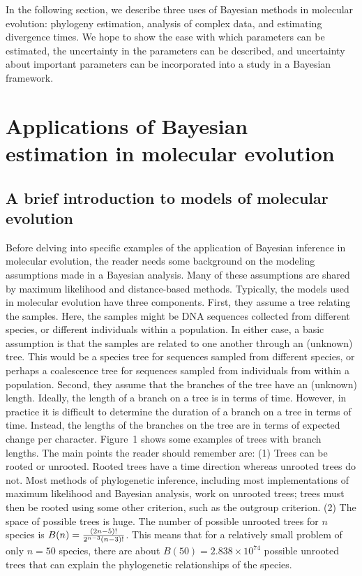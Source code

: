 \documentclass{svmult}
\begin{document}
In the following section, we describe three uses of Bayesian methods in molecular evolution:
phylogeny estimation, analysis of complex data, and estimating divergence times.
We hope to show the ease with which parameters can be estimated, the uncertainty in
the parameters can be described, and uncertainty about important parameters can be incorporated
into a study in a Bayesian framework.

\section{Applications of Bayesian estimation in molecular evolution}
\label{sec:3}

\subsection{A brief introduction to models of molecular evolution}


Before delving into specific examples of the application of Bayesian inference in molecular evolution, the reader
needs some background on the modeling assumptions made in a Bayesian analysis. Many of these assumptions
are shared by maximum likelihood and distance-based methods.
Typically, the models used in molecular evolution have three components. First, they assume
a tree relating the samples. Here, the samples might be DNA sequences collected from different
species, or different individuals within a population. In either case, a basic assumption
is that the samples are related to one another through an (unknown) tree. This would be
a species tree for sequences sampled from different species, or perhaps a coalescence tree for sequences
sampled from individuals from within a population. Second, they assume that the branches
of the tree have an (unknown) length. Ideally, the length of a branch on a tree is in
terms of time. However, in practice it is difficult to determine the duration of a branch
on a tree in terms of time. Instead, the lengths of the branches on the tree are in terms
of expected change per character.  Figure~1 shows some examples of trees with branch lengths. The main points
the reader should remember are: (1) Trees can be rooted or unrooted. Rooted trees have a time direction whereas unrooted trees
do not. Most methods of phylogenetic inference, including most implementations of maximum likelihood and Bayesian
analysis, work on unrooted trees; trees must then be rooted using some other criterion, such as the outgroup criterion. 
(2) The space of possible trees
is huge. The number of possible unrooted trees for $n$ species is $B(n) = {(2n-5)! \over 2^{n-3}(n-3)!}$. This means that for a relatively small problem
of only $n=50$ species, there are about $B(50) = 2.838 \times 10^{74}$ possible unrooted trees that can explain the phylogenetic relationships of 
the species.
\end{document}
